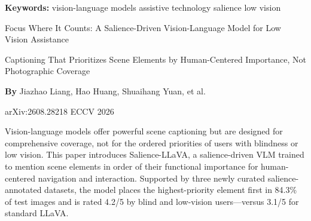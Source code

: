 \documentclass[10pt,twocolumn]{article}
\begin{document}
\setlength{\parindent}{0pt}
\setlength{\parskip}{4pt}

{\small\color{keywordgray}\textbf{Keywords:}
  vision-language models \textbullet{}
  assistive technology \textbullet{}
  salience \textbullet{}
  low vision}\par\vspace{4pt}

{\LARGE\bfseries\raggedright
  Focus Where It Counts: A Salience-Driven
  Vision-Language Model for Low Vision Assistance}\par\vspace{4pt}

{\large\itshape\raggedright
  Captioning That Prioritizes Scene Elements by Human-Centered
  Importance, Not Photographic Coverage}\par\vspace{6pt}

{\small\textbf{By} Jiazhao Liang, Hao Huang, Shuaihang Yuan, et al.}\par\vspace{2pt}

{\small\color{keywordgray}arXiv:2608.28218 \textbullet{} ECCV 2026}
\par\vspace{2pt}\noindent{\color{rulered}\rule{\columnwidth}{0.6pt}}\vspace{6pt}

Vision-language models offer powerful scene captioning but are designed
for comprehensive coverage, not for the ordered priorities of users with
blindness or low vision. This paper introduces Salience-LLaVA, a
salience-driven VLM trained to mention scene elements in order of their
functional importance for human-centered navigation and interaction.
Supported by three newly curated salience-annotated datasets, the model
places the highest-priority element first in 84.3\% of test images
and is rated 4.2/5 by blind and low-vision users—versus 3.1/5 for
standard LLaVA.
\end{document}

